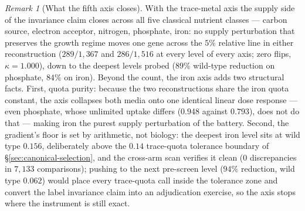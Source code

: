 \documentclass[11pt,a4paper]{article}
\theoremstyle{plain}
\theoremstyle{definition}
\theoremstyle{remark}
\newtheorem{remark}[theorem]{Remark}
\begin{document}
\begin{remark}[What the fifth axis closes]
\label{rem:keio-iron-invariance}
With the trace-metal axis the supply side of the invariance claim
closes across all five classical nutrient classes --- carbon
source, electron acceptor, nitrogen, phosphate, iron: no supply
perturbation that preserves the growth regime moves one gene
across the $5\%$ relative line in either reconstruction
($289/1{,}367$ and $286/1{,}516$ at every level of every axis;
zero flips, $\kappa=1.000$), down to the deepest levels probed
($89\%$ wild-type reduction on phosphate, $84\%$ on iron). Beyond
the count, the iron axis adds two structural facts. First, quota
purity: because the two reconstructions share the iron quota
constant, the axis collapses both media onto one identical linear
dose response --- even phosphate, whose unlimited uptake differs
($0.948$ against $0.793$), does not do that --- making iron the
purest supply perturbation of the battery. Second, the gradient's
floor is set by arithmetic, not biology: the deepest iron level
sits at wild type $0.156$, deliberately above the $0.14$
trace-quota tolerance boundary of \S\ref{sec:canonical-selection},
and the cross-arm scan verifies it clean ($0$ discrepancies in
$7{,}133$ comparisons); pushing to the next pre-screen level
($94\%$ reduction, wild type $0.062$) would place every
trace-quota call inside the tolerance zone and convert the label
invariance claim into an adjudication exercise, so the axis stops
where the instrument is still exact.
\end{remark}
\end{document}
